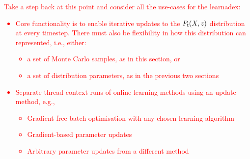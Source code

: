 \textcolor{red}{Take a step back at this point and consider all the use-cases for the learnadex:
\begin{itemize}
\item{Core functionality is to enable iterative updates to the $P_{\sf t}(X,z)$ distribution at every timestep. There must also be flexibility in how this distribution can represented, i.e., either:
\begin{itemize}
\item{a set of Monte Carlo samples, as in this section, or}
\item{a set of distribution parameters, as in the previous two sections}
\end{itemize}
}
\item{Separate thread context runs of online learning methods using an update method, e.g.,}
\begin{itemize}
\item{Gradient-free batch optimisation with any chosen learning algorithm}
\item{Gradient-based parameter updates}
\item{Arbitrary parameter updates from a different method}
\end{itemize}
\end{itemize}}




